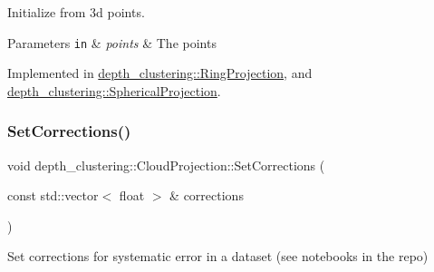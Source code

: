 Initialize from 3d points. 


\begin{DoxyParams}[1]{Parameters}
\mbox{\tt in}  & {\em points} & The points \\
\hline
\end{DoxyParams}


Implemented in \hyperlink{classdepth__clustering_1_1RingProjection_acfda4cfe9a0b80936987691fe44fc79c}{depth\+\_\+clustering\+::\+Ring\+Projection}, and \hyperlink{classdepth__clustering_1_1SphericalProjection_ab80cb1d72f60e7a887affa0ab10ebc03}{depth\+\_\+clustering\+::\+Spherical\+Projection}.

\mbox{\label{classdepth__clustering_1_1CloudProjection_afcc642064042bba2a1112ed2a37190f9}} 
\subsubsection{\texorpdfstring{Set\+Corrections()}{SetCorrections()}}
{\footnotesize\ttfamily void depth\+\_\+clustering\+::\+Cloud\+Projection\+::\+Set\+Corrections (\begin{DoxyParamCaption}\item[{const std\+::vector$<$ float $>$ \&}]{corrections }\end{DoxyParamCaption})\hspace{0.3cm}{\ttfamily [inline]}}



Set corrections for systematic error in a dataset (see notebooks in the repo) 


